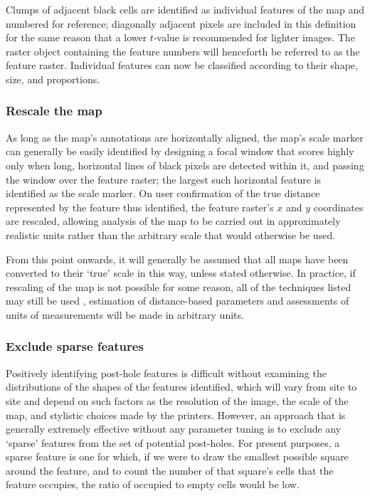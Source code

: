 \documentclass[../../ArchStats.tex]{subfiles}
\begin{document}
Clumps of adjacent black cells are identified as individual features of the map and numbered for reference; diagonally adjacent pixels are included in this definition for the same reason that a lower $t$-value is recommended for lighter images. The raster object containing the feature numbers will henceforth be referred to as the feature raster. Individual features can now be classified according to their shape, size, and proportions.

\subsubsection{Rescale the map}
\label{sec:rescale}

As long as the map's annotations are horizontally aligned, the map's scale marker can generally be easily identified by designing a focal window that scores highly only when long, horizontal lines of black pixels are detected within it, and passing the window over the feature raster; the largest such horizontal feature is identified as the scale marker. On user confirmation of the true distance represented by the feature thus identified, the feature raster's $x$ and $y$ coordinates are rescaled, allowing analysis of the map to be carried out in approximately realistic units rather than the arbitrary scale that would otherwise be used.

From this point onwards, it will generally be assumed that all maps have been converted to their `true' scale in this way, unless stated otherwise. In practice, if rescaling of the map is not possible for some reason, all of the techniques listed may still be used , estimation of distance-based parameters and assessments of units of measurements  will be made in arbitrary units.


\subsubsection{Exclude sparse features}

Positively identifying post-hole features is difficult without examining the distributions of the shapes of the features identified, which will vary from site to site and depend on such factors as the resolution of the image, the scale of the map, and stylistic choices made by the printers. However, an approach that is generally extremely effective without any parameter tuning is to exclude any `sparse' features from the set of potential post-holes. For present purposes, a sparse feature is one for which, if we were to draw the smallest possible square around the feature, and to count the number of that square's cells that the feature occupies, the ratio of occupied to empty cells would be low.
\end{document}
